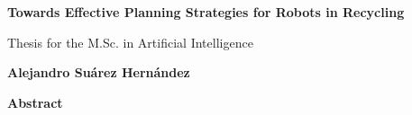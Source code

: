 \documentclass[11pt,a4paper,oldfontcommands,oneside]{memoir}
\begin{document}


\cleardoublepage

\thispagestyle{plain}
\begin{center}
	\Large
	\textbf{Towards Effective Planning Strategies for Robots in Recycling}
	
	\vspace{0.4cm}
	\large
	Thesis for the M.Sc. in Artificial Intelligence
	
	\vspace{0.4cm}
	\textbf{Alejandro Su\'arez Hern\'andez}
	
	\vspace{0.9cm}
	\textbf{Abstract}
\end{center}
\blindtext

\cleardoublepage


\tableofcontents

%





\printbibliography

%
%
%
%
%
%
\end{document}
